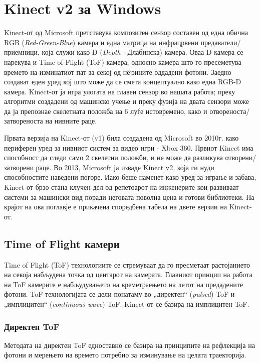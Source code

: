 \documentclass[12pt]{article}
\begin{document}
\newpage

\section{Kinect v2 за Windows}
	Kinect-от од Microsoft претставува композитен сензор составен од една обична RGB (\textit{Red-Green-Blue}) камера и една матрица на инфрацрвени предаватели/приемници, која служи како D (\textit{Depth} - Длабинска) камера. Оваа D камера се нарекува и Time of Flight (ToF) камера, односно камера што го пресеметува времето на изминатиот пат за секој од нејзините оддадени фотони. Заедно создават еден уред кој што може да се смета концептуално како една RGB-D камера. Kinect-от ја игра улогата на главен сензор во нашата работа; преку алгоритми создадени од машинско учење и преку фузија на двата сензори може да ја препознае скелетната положба на 6 луѓе истовремено, како и отвореноста/затвореноста на нивните раце.

	Првата верзија на Kinect-от (v1) била создадена од Microsoft во 2010г. како периферен уред за нивниот систем за видео игри - Xbox 360. Првиот Kinect има способност да следи само 2 скелетни положби, и не може да разликува отворени/затворени раце. Во 2013, Microsoft ја изваде Kinect v2, која ги нуди способностите наведени погоре. Иако беше наменет како уред за играње и забава, Kinect-от брзо стана клучен дел од репетоарот на инженерите кои развиваат системи за машински вид поради неговата поволна цена и готови библиотеки. На крајот на ова поглавје е прикачена споредбена табела на двете верзии на Kinect-от.

  \subsection{Time of Flight камери}
  	Time of Flight (ToF) технологиите се стремуваат да го пресметаат растојанието на секоја набљудена точка од центарот на камерата. Главниот принцип на работа на ToF камерите е набљудувањето на времетраењето на летот на предадените фотони. ToF технологијата се дели понатаму во „директен“ (\textit{pulsed}) ToF и „имплицитен“ (\textit{continuous wave}) ToF. Kinect-от се базира на имплицитен ToF.

	\subsubsection{Директен ToF}
		Методата на директен ToF едноставно се базира на принципите на рефлекција на фотони и мерењето на времето потребно за изминување на целата траекторија.
\end{document}
